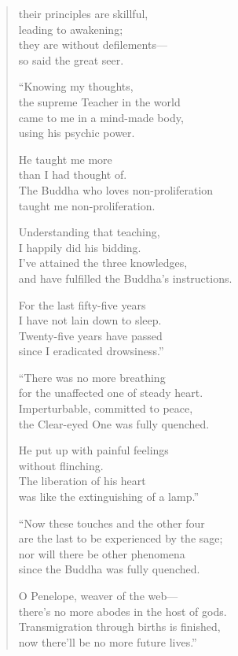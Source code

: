 \documentclass[12pt,openany]{book}%
\begin{document}
\begin{verse}
their principles are skillful, \\
leading to awakening; \\
they are without defilements—\\
so said the great seer. 

“Knowing my thoughts, \\
the supreme Teacher in the world \\
came to me in a mind-made body, \\
using his psychic power. 

He taught me more \\
than I had thought of. \\
The Buddha who loves non-proliferation \\
taught me non-proliferation. 

Understanding that teaching, \\
I happily did his bidding. \\
I’ve attained the three knowledges, \\
and have fulfilled the Buddha’s instructions. 

For the last fifty-five years \\
I have not lain down to sleep. \\
Twenty-five years have passed \\
since I eradicated drowsiness.” 

“There was no more breathing \\
for the unaffected one of steady heart. \\
Imperturbable, committed to peace, \\
the Clear-eyed One was fully quenched. 

He put up with painful feelings \\
without flinching. \\
The liberation of his heart \\
was like the extinguishing of a lamp.” 

“Now these touches and the other four \\
are the last to be experienced by the sage; \\
nor will there be other phenomena \\
since the Buddha was fully quenched. 

O Penelope, weaver of the web—\\
there’s no more abodes in the host of gods. \\
Transmigration through births is finished, \\
now there’ll be no more future lives.” 


\end{verse}
\end{document}
